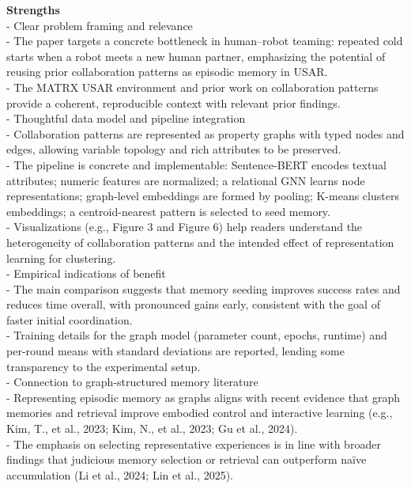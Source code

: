\documentclass[letterpaper]{article} %
\begin{document}
\textbf{Strengths}\\
- Clear problem framing and relevance\\
\hspace*{1em}- The paper targets a concrete bottleneck in human–robot teaming: repeated cold starts when a robot meets a new human partner, emphasizing the potential of reusing prior collaboration patterns as episodic memory in USAR.\\
\hspace*{1em}- The MATRX USAR environment and prior work on collaboration patterns provide a coherent, reproducible context with relevant prior findings.\\[0.25em]
- Thoughtful data model and pipeline integration\\
\hspace*{1em}- Collaboration patterns are represented as property graphs with typed nodes and edges, allowing variable topology and rich attributes to be preserved.\\
\hspace*{1em}- The pipeline is concrete and implementable: Sentence-BERT encodes textual attributes; numeric features are normalized; a relational GNN learns node representations; graph-level embeddings are formed by pooling; K-means clusters embeddings; a centroid-nearest pattern is selected to seed memory.\\
\hspace*{1em}- Visualizations (e.g., Figure 3 and Figure 6) help readers understand the heterogeneity of collaboration patterns and the intended effect of representation learning for clustering.\\[0.25em]
- Empirical indications of benefit\\
\hspace*{1em}- The main comparison suggests that memory seeding improves success rates and reduces time overall, with pronounced gains early, consistent with the goal of faster initial coordination.\\
\hspace*{1em}- Training details for the graph model (parameter count, epochs, runtime) and per-round means with standard deviations are reported, lending some transparency to the experimental setup.\\[0.25em]
- Connection to graph-structured memory literature\\
\hspace*{1em}- Representing episodic memory as graphs aligns with recent evidence that graph memories and retrieval improve embodied control and interactive learning (e.g., Kim, T., et al., 2023; Kim, N., et al., 2023; Gu et al., 2024).\\
\hspace*{1em}- The emphasis on selecting representative experiences is in line with broader findings that judicious memory selection or retrieval can outperform naïve accumulation (Li et al., 2024; Lin et al., 2025).
\end{document}
